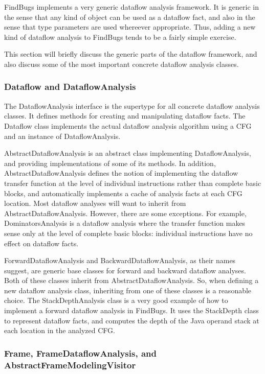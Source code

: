 \documentclass[11pt]{article}
\begin{document}
FindBugs implements a very generic dataflow analysis framework.
It is generic in the sense that any kind of object can be used as
a dataflow fact, and also in the sense that type parameters are used
whereever appropriate.  Thus, adding a new kind of dataflow analysis
to FindBugs tends to be a fairly simple exercise.

This section will briefly discuss the generic parts of the dataflow framework,
and also discuss some of the most important concrete dataflow analysis
classes.

\subsubsection{Dataflow and DataflowAnalysis}

The DataflowAnalysis interface is the supertype for all concrete dataflow
analysis classes.  It defines methods for creating and manipulating dataflow
facts.  The Dataflow class implements the actual dataflow analysis algorithm
using a CFG and an instance of DataflowAnalysis.

AbstractDataflowAnalysis is an abstract class implementing DataflowAnalysis,
and providing implementations of some of its methods.  In addition,
AbstractDataflowAnalysis defines the notion of implementing the dataflow transfer
function at the level of individual instructions rather than complete basic
blocks, and automatically implements a cache of analysis facts at each
CFG location.  Most dataflow analyses will want to inherit from
AbstractDataflowAnalysis.  However, there are some exceptions.
For example, DominatorsAnalysis is a dataflow analysis where the transfer
function makes sense only at the level of complete basic blocks:
individual instructions have no effect on dataflow facts.

ForwardDataflowAnalysis and BackwardDataflowAnalysis, as their names suggest,
are generic base classes for forward and backward dataflow analyses.
Both of these classes inherit from AbstractDataflowAnalysis.
So, when defining a new dataflow analysis class, inheriting from one of these
classes is a reasonable choice.  The StackDepthAnalysis class is a very good
example of how to implement a forward dataflow analysis in FindBugs.
It uses the StackDepth class to represent dataflow facts, and computes the
depth of the Java operand stack at each location in the analyzed CFG.

\subsubsection{Frame, FrameDataflowAnalysis, and AbstractFrameModelingVisitor}
\end{document}
